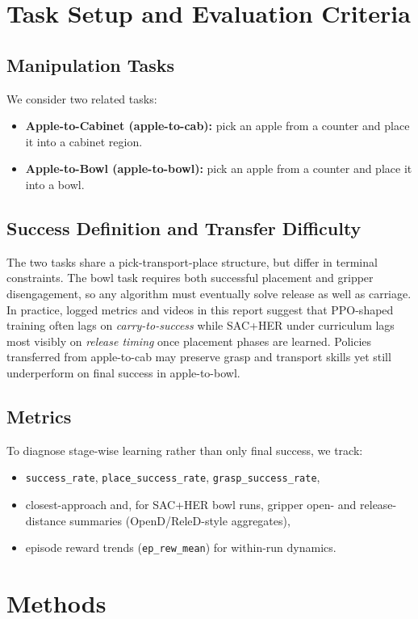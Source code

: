\documentclass[11pt,a4paper]{article}
\begin{document}
\section{Task Setup and Evaluation Criteria}
\subsection{Manipulation Tasks}
We consider two related tasks:
\begin{itemize}
    \item \textbf{Apple-to-Cabinet (apple-to-cab):} pick an apple from a counter and place it into a cabinet region.
    \item \textbf{Apple-to-Bowl (apple-to-bowl):} pick an apple from a counter and place it into a bowl.
\end{itemize}

\subsection{Success Definition and Transfer Difficulty}
The two tasks share a pick-transport-place structure, but differ in terminal constraints. The bowl task requires both successful placement and gripper disengagement, so any algorithm must eventually solve release as well as carriage. In practice, logged metrics and videos in this report suggest that PPO-shaped training often lags on \emph{carry-to-success} while SAC+HER under curriculum lags most visibly on \emph{release timing} once placement phases are learned. Policies transferred from apple-to-cab may preserve grasp and transport skills yet still underperform on final success in apple-to-bowl.

\subsection{Metrics}
To diagnose stage-wise learning rather than only final success, we track:
\begin{itemize}
    \item \texttt{success\_rate}, \texttt{place\_success\_rate}, \texttt{grasp\_success\_rate},
    \item closest-approach and, for SAC+HER bowl runs, gripper open- and release-distance summaries (OpenD/ReleD-style aggregates),
    \item episode reward trends (\texttt{ep\_rew\_mean}) for within-run dynamics.
\end{itemize}

\section{Methods}
\end{document}
